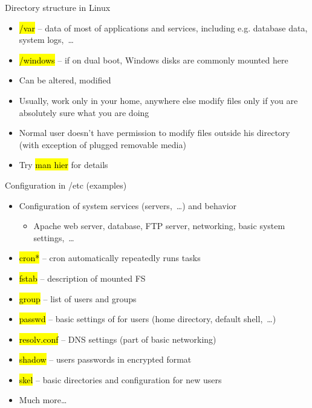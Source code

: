 \documentclass[compress, ucs, xelatex, 11pt, xcolor=svgnames,
  hyperref={
    bookmarks=true,
    unicode=true,
    colorlinks=true,
    pdftitle={Linux, command line and MetaCentrum},
    plainpages=false,
    pdfauthor={Vojtech Zeisek},
    pdfsubject={Course about use of Linux command line, writing shell scripts and using MetaCentrum of CESNET},
    pdfcreator={XeLaTeX},
    pdfkeywords={Linux, GNU, BASH, shell, command line, MetaCentrum},
    linkcolor=DarkRed,
    anchorcolor=DarkBlue,
    citecolor=Indigo,
    filecolor=NavyBlue,
    menucolor=DarkMagenta,
    urlcolor=DarkBlue,
    pdftex},
  url={hyphens, lowtilde} %
  ]{beamer}
\renewcommand{\texttt}[1]{\hl{\ttfamily #1}}
\renewcommand{\alert}[1]{\textcolor{red}{#1}}
\begin{document}
\begin{frame}[allowframebreaks]{Directory structure in Linux}
\begin{itemize}
  \item \alert{\texttt{/var}} -- data of most of applications and services, including e.g. database data, system logs,~\ldots
  \item \alert{\texttt{/windows}} -- if on dual boot, Windows disks are commonly mounted here
  \item Can be altered, modified
  \item Usually, work only in your home, anywhere else modify files only if you are absolutely sure what you are doing
  \item Normal user doesn't have permission to modify files outside his directory (with exception of plugged removable media)
  \item Try \texttt{man hier} for details
\end{itemize}
\end{frame}

\begin{frame}{Configuration in /etc (examples)}
\begin{itemize}
  \item Configuration of system services (servers,~\ldots) and behavior
  \begin{itemize}
    \item Apache web server, database, FTP server, networking, basic system settings,~\ldots
  \end{itemize}
  \item \texttt{cron*} -- cron automatically repeatedly runs tasks
  \item \texttt{fstab} -- description of mounted FS
  \item \texttt{group} -- list of users and groups
  \item \texttt{passwd} -- basic settings of for users (home directory, default shell,~\ldots)
  \item \texttt{resolv.conf} --  DNS settings (part of basic networking)
  \item \texttt{shadow} -- users passwords in encrypted format
  \item \texttt{skel} -- basic directories and configuration for new users
  \item Much more\ldots
\end{itemize}
\end{frame}
\end{document}
